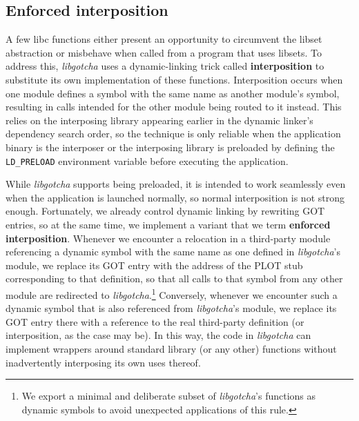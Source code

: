 \subsection{Enforced interposition}
\label{sec:libgotcha:interpose}

A few libc functions either present an opportunity to circumvent the libset
abstraction or misbehave when called from a program that uses libsets.  To address
this, \textit{libgotcha} uses a dynamic-linking trick called \textbf{interposition}
to substitute its own implementation of these functions.  Interposition occurs when
one module defines a symbol with the same name as another module's symbol, resulting
in calls intended for the other module being routed to it instead.  This relies on
the interposing library appearing earlier in the dynamic linker's dependency search
order, so the technique is only reliable when the application binary is the
interposer or the interposing library is preloaded by defining the
\texttt{LD\_PRELOAD} environment variable before executing the application.

While \textit{libgotcha} supports being preloaded, it is intended to work seamlessly
even when the application is launched normally, so normal interposition is not strong
enough.  Fortunately, we already control dynamic linking by rewriting GOT entries, so
at the same time, we implement a variant that we term \textbf{enforced
interposition}.  Whenever we encounter a relocation in a third-party module
referencing a dynamic symbol with the same name as one defined in
\textit{libgotcha}'s module, we replace its GOT entry with the address of the PLOT
stub corresponding to that definition, so that all calls to that symbol from any
other module are redirected to \textit{libgotcha}.\footnote{We export a minimal and
deliberate subset of \textit{libgotcha}'s functions as dynamic symbols to avoid
unexpected applications of this rule.}  Conversely, whenever we encounter such a
dynamic symbol that is also referenced from \textit{libgotcha}'s module, we replace
its GOT entry there with a reference to the real third-party definition (or
interposition, as the case may be).  In this way, the code in \textit{libgotcha} can
implement wrappers around standard library (or any other) functions without
inadvertently interposing its own uses thereof.

